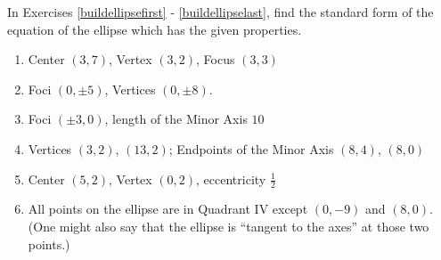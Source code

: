 In Exercises \ref{buildellipsefirst} - \ref{buildellipselast},  find the standard form of the equation of the ellipse which has the given properties.

\begin{enumerate}
\setcounter{enumi}{\value{HW}}

\item Center $(3, 7)$, Vertex $(3, 2)$, Focus $(3, 3)$  \label{buildellipsefirst}
\item Foci $(0, \pm 5)$, Vertices $(0, \pm 8)$.
\item Foci $(\pm 3, 0)$, length of the Minor Axis $10$
\item Vertices $(3,2)$, $(13,2)$; Endpoints of the Minor Axis $(8,4)$, $(8,0)$
\item Center $(5,2)$, Vertex $(0,2)$, eccentricity $\frac{1}{2}$
\item All points on the ellipse are in Quadrant IV except $(0, -9)$ and $(8, 0)$.  (One might also say that the ellipse is ``tangent to the axes'' at those two points.)  \label{buildellipselast}

\setcounter{HW}{\value{enumi}}
\end{enumerate}

